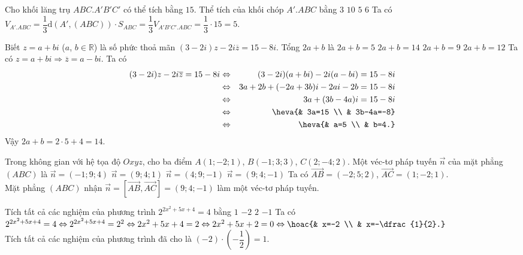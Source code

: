 \begin{ex}%
	Cho khối lăng trụ $ABC.A'B'C'$ có thể tích bằng $15$. Thể tích của khối chóp $A'.ABC$ bằng
	\choice
	{$3$}
	{$10$}
	{\True $5$}
	{$6$}
	\loigiai
	{
		Ta có $V_{A'.ABC}=\dfrac{1}{3}\mathrm{d}(A',(ABC))\cdot S_{ABC}=\dfrac{1}{3}V_{A'B'C'.ABC}=\dfrac{1}{3}\cdot 15=5$.	
	}
\end{ex}

\begin{ex}%
	Biết $z=a+bi$ ($a$, $b\in \mathbb{R}$) là số phức thoả mãn $(3-2i)z-2i\overline{z}=15-8i$. Tổng $2a+b$ là
	\choice
	{$2a+b=5$}
	{\True $2a+b=14$}
	{$2a+b=9$}
	{$2a+b=12$}
	\loigiai
	{
		Ta có $z=a+bi\Rightarrow \overline{z}=a-bi$. Ta có
		\begin{eqnarray*}
			(3-2i)z-2i\overline{z}=15-8i&\Leftrightarrow & (3-2i)(a+bi)-2i(a-bi)=15-8i\\
			&\Leftrightarrow & 3a+2b+(-2a+3b)i-2ai-2b=15-8i\\
			&\Leftrightarrow & 3a+(3b-4a)i=15-8i\\
			&\Leftrightarrow & \heva{& 3a=15 \\ & 3b-4a=-8}\\
			&\Leftrightarrow &\heva{& a=5 \\ & b=4.}
		\end{eqnarray*}
		Vậy $2a+b=2\cdot 5+4=14$.
	}
\end{ex}

\begin{ex}%
	Trong không gian với hệ tọa độ $Oxyz$, cho ba điểm $A(1;-2;1)$, $B(-1;3;3)$, $C(2;-4;2)$. Một véc-tơ pháp tuyến $\overrightarrow{n}$ của mặt phẳng $(ABC)$ là
	\choice
	{$\overrightarrow{n}=(-1;9;4)$}
	{$\overrightarrow{n}=(9;4;1)$}
	{$\overrightarrow{n}=(4;9;-1)$}
	{\True $\overrightarrow{n}=(9;4;-1)$}
	\loigiai
	{
		Ta có $\overrightarrow{AB}=(-2;5;2)$, $\overrightarrow{AC}=(1;-2;1)$.\\
		Mặt phẳng $(ABC)$ nhận $\overrightarrow{n}=\left[\overrightarrow{AB},\overrightarrow{AC}\right]=(9;4;-1)$ làm một véc-tơ pháp tuyến.
	}
\end{ex}

\begin{ex}%
	Tích tất cả các nghiệm của phương trình $2^{2x^2+5x+4}=4$ bằng
	\choice
	{\True $1$}
	{$-2$}
	{$2$}
	{$-1$}
	\loigiai
	{
		Ta có $2^{2x^2+5x+4}=4\Leftrightarrow 2^{2x^2+5x+4}=2^2\Leftrightarrow 2x^2+5x+4=2\Leftrightarrow 2x^2+5x+2=0\Leftrightarrow \hoac{& x=-2 \\ & x=-\dfrac{1}{2}.}$\\
		Tích tất cả các nghiệm của phương trình đã cho là $\left(-2\right)\cdot \left(-\dfrac{1}{2}\right)=1$.
	}
\end{ex}

